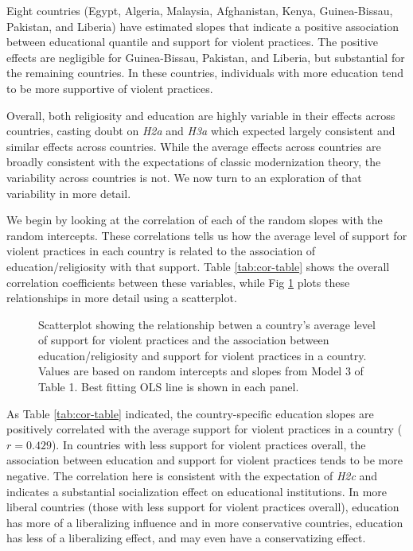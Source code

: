 \documentclass[10pt,letterpaper]{article}
\begin{document}
Eight countries (Egypt, Algeria, Malaysia, Afghanistan, Kenya, Guinea-Bissau, Pakistan, and Liberia) have estimated slopes that indicate a positive association between educational quantile and support for violent practices. The positive effects are negligible for Guinea-Bissau, Pakistan, and Liberia, but substantial for the remaining countries. In these countries, individuals with more education tend to be more supportive of violent practices.

Overall, both religiosity and education are highly variable in their effects across countries, casting doubt on \emph{H2a} and \emph{H3a} which expected largely consistent and similar effects across countries. While the average effects across countries are broadly consistent with the expectations of classic modernization theory, the variability across countries is not. We now turn to an exploration of that variability in more detail.

We begin by looking at the correlation of each of the random slopes with the random intercepts. These correlations tells us how the average level of support for violent practices in each country is related to the association of education/religiosity with that support. Table \ref{tab:cor-table} shows the overall correlation coefficients between these variables, while Fig \ref{fig:intercept-slope-plot} plots these relationships in more detail using a scatterplot.

\begin{figure}[!h]
\centering
\caption{Scatterplot showing the relationship betwen a country's average level of support for violent practices and the association between education/religiosity and support for violent practices in a country. Values are based on random intercepts and slopes from Model 3 of Table 1. Best fitting OLS line is shown in each panel.}
\label{fig:intercept-slope-plot}
\end{figure}

As Table \ref{tab:cor-table} indicated, the country-specific education slopes are positively correlated with the average support for violent practices in a country (\(r=0.429\)). In countries with less support for violent practices overall, the association between education and support for violent practices tends to be more negative. The correlation here is consistent with the expectation of \emph{H2c} and indicates a substantial socialization effect on educational institutions. In more liberal countries (those with less support for violent practices overall), education has more of a liberalizing influence and in more conservative countries, education has less of a liberalizing effect, and may even have a conservatizing effect.
\end{document}
